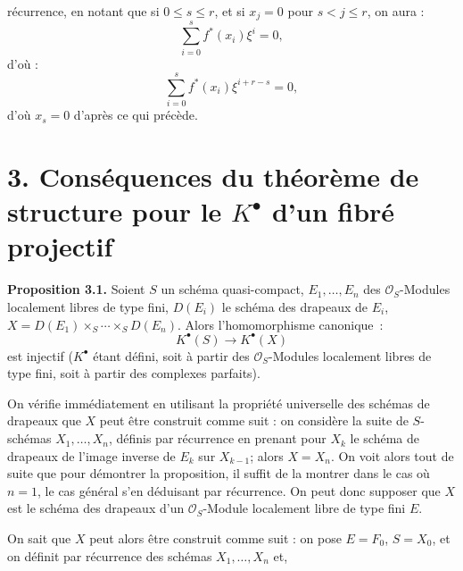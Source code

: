 récurrence, en notant que si $0\leq s\leq r$, et si $x_j=0$ pour $s<j\leq r$, on aura :
\[
  \sum_{i=0}^{s}f^*(x_i)\xi^i=0,
\]
d'où :
\[
  \sum_{i=0}^{s}f^*(x_i)\xi^{i+r-s}=0,
\]
d'où $x_s=0$ d'après ce qui précède.

\section*{3. Conséquences du théorème de structure pour le \(K^{\bullet}\) d'un fibré projectif}

\textbf{Proposition 3.1.} Soient \(S\) un schéma quasi-compact, \(E_1,\ldots,E_n\) des \(\mathcal O_S\)-Modules localement libres de type fini, \(D(E_i)\) le schéma des drapeaux de \(E_i\), \(X=D(E_1)\times_S\cdots\times_S D(E_n)\).
Alors l'homomorphisme canonique~:
\[
  K^{\bullet}(S)\longrightarrow K^{\bullet}(X)
\]
est injectif (\(K^{\bullet}\) étant défini, soit à partir des \(\mathcal O_S\)-Modules localement libres de type fini, soit à partir des complexes parfaits).

On vérifie immédiatement en utilisant la propriété universelle des schémas de drapeaux que \(X\) peut être construit comme suit : on considère la suite de \(S\)-schémas \(X_1,\ldots,X_n\), définis par récurrence en prenant pour \(X_k\) le schéma de drapeaux de l'image inverse de \(E_k\) sur \(X_{k-1}\); alors \(X=X_n\). On voit alors tout de suite que pour démontrer la proposition, il suffit de la montrer dans le cas où \(n=1\), le cas général s'en déduisant par récurrence. On peut donc supposer que \(X\) est le schéma des drapeaux d'un \(\mathcal O_S\)-Module localement libre de type fini \(E\).

On sait que \(X\) peut alors être construit comme suit : on pose \(E=F_0\), \(S=X_0\), et on définit par récurrence des schémas \(X_1,\ldots,X_n\) et,
